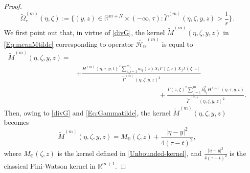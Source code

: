 \documentclass[11pt,a4paper]{article}
\numberwithin{equation}{section}
\newcommand{\R}{\mathbb{R}}
\def \GG {{\mathbb{G}}}
\def \p {\partial}
\def \H {\mathscr{H}_\GG}
\def \G {{\Gamma}}
\def \t {{\tau}}
\def \y {{\eta}}
\def \z {{\zeta}}
\begin{document}
{{\begin{proof}
\begin{equation}
		\tilde{\Omega}^{(m)}_r(\y,\z):=\biggl\{ (y,z) \in \R^{m+N} \times (-\infty,\t): \tilde{\Gamma}^{(m)}(\y,\z,y,z)>\frac{1}{r}\biggr\}.
	\end{equation}
	We first point out that, in virtue of \eqref{divG}, the kernel $\tilde{M}^{(m)}(\y,\z,y,z)$ in \eqref{Eq:meanMtilde} corresponding to operator $\tilde{\H}^{(m)}$ is equal to 
	\begin{equation}
		\begin{aligned}
			\tilde{M}^{(m)}(\y,\z,y,z)=&\\
			&+ \frac{H^{(m)}(\y,\t,y,t)^2\displaystyle\sum\nolimits_{i,j=1}^{m_1}a_{ij}(z)X_i\G(\z,z)X_j\G(\z,z)}{\tilde{\Gamma}^{(m)}(\y,\z,y,z)^2}\\
			&\qquad\qquad\qquad\qquad\qquad\qquad+\frac{\G(z,\z)^2\displaystyle\sum\nolimits_{j=1}^{m}\p_{y_j}^2H^{(m)}(\y,\t,y,t)}{\tilde{\Gamma}^{(m)}(\y,\z,y,z)^2}.
		\end{aligned}
	\end{equation}
	Then, owing to \eqref{divG} and \eqref{Eq:Gammatilde}, the kernel $\tilde{M}^{(m)}(\y,\z,y,z)$ becomes
	\begin{equation}\label{Eq:Mtildesum}
		\tilde{M}^{(m)}(\y,\z,y,z)=M_\GG(\z,z)+\frac{|\y-y|^2}{4(\t-t)^2},
	\end{equation}
	where $M_\GG(\z,z)$ is the kernel defined in \eqref{Unbounded-kernel}, and $\frac{|\y-y|^2}{4(\t-t)^2}$ is the classical Pini-Watson kernel in $\R^{m+1}$.
		

\end{proof}}}
\end{document}
